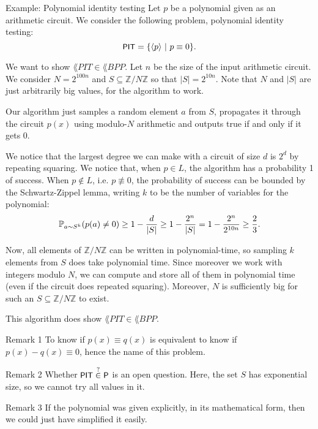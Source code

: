 \documentclass[a4paper]{article}
\begin{document}
\begin{parag}{Example: Polynomial identity testing}
    Let $p$ be a polynomial given as an arithmetic circuit. We consider the following problem, polynomial identity testing: 
    \[\lang{PIT} = \left\{\left\langle p \right\rangle \suchthat p \equiv 0\right\}.\]
    
    We want to show $\lang{PIT} \in \lang{BPP}$. Let $n$ be the size of the input arithmetic circuit. We consider $N = 2^{100 n}$ and $S \subseteq \mathbb{Z}/N\mathbb{Z}$ so that $\left|S\right| = 2^{10 n}$. Note that $N$ and $\left|S\right|$ are just arbitrarily big values, for the algorithm to work.

    Our algorithm just samples a random element $a$ from $S$, propagates it through the circuit $p\left(x\right)$ using modulo-$N$ arithmetic and outputs true if and only if it gets 0.

    We notice that the largest degree we can make with a circuit of size $d$ is $2^d$ by repeating squaring. We notice that, when $p \in L$, the algorithm has a probability 1 of success. When $p \not \in L$, i.e. $p \not\equiv 0$, the probability of success can be bounded by the Schwartz-Zippel lemma, writing $k$ to be the number of variables for the polynomial: 
    \[\prob_{a \followsdistr S^k}\left(p\left(a\right) \neq 0\right) \geq 1 - \frac{d}{\left|S\right|} \geq 1 - \frac{2^n}{\left|S\right|} = 1 - \frac{2^n}{2^{10n}} \geq \frac{2}{3}.\]

    Now, all elements of $\mathbb{Z}/N\mathbb{Z}$ can be written in polynomial-time, so sampling $k$ elements from $S$ does take polynomial time. Since moreover we work with integers modulo $N$, we can compute and store all of them in polynomial time (even if the circuit does repeated squaring). Moreover, $N$ is sufficiently big for such an $S \subseteq \mathbb{Z}/N\mathbb{Z}$ to exist.

    This algorithm does show $\lang{PIT} \in \lang{BPP}$.


    \begin{subparag}{Remark 1}
        To know if $p\left(x\right) \equiv q\left(x\right)$ is equivalent to know if $p\left(x\right)- q\left(x\right) \equiv 0$, hence the name of this problem.
    \end{subparag}

    \begin{subparag}{Remark 2}
        Whether $\lang{PIT} \over{\in}{?} \lang{P}$ is an open question. Here, the set $S$ has exponential size, so we cannot try all values in it.
    \end{subparag}

    \begin{subparag}{Remark 3}
        If the polynomial was given explicitly, in its mathematical form, then we could just have simplified it easily.
    \end{subparag}
\end{parag}
\end{document}
